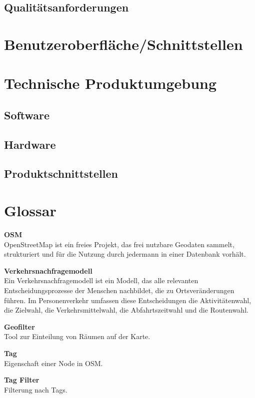 \documentclass[parskip=full]{scrartcl} %
\begin{document}
\subsection{Qualitätsanforderungen}


\newpage



\section{Benutzeroberfläche/Schnittstellen}
\newpage



\section{Technische Produktumgebung}

\subsection{Software}
\subsection{Hardware}
\subsection{Produktschnittstellen}

\section{Glossar}
\textbf{OSM}\\
OpenStreetMap ist ein freies Projekt, das frei nutzbare Geodaten sammelt, strukturiert und für die Nutzung durch jedermann in einer Datenbank vorhält.

\textbf{Verkehrsnachfragemodell}\\
Ein Verkehrsnachfragemodell ist ein Modell, das alle relevanten Entscheidungsprozesse der Menschen nachbildet, die zu Ortsveränderungen führen. Im Personenverkehr umfassen diese Entscheidungen die Aktivitätenwahl, die Zielwahl, die Verkehrsmittelwahl, die Abfahrtszeitwahl und die Routenwahl.

\textbf{Geofilter}\\
Tool zur Einteilung von Räumen auf der Karte.

\textbf{Tag}\\
Eigenschaft einer Node in OSM.

\textbf{Tag Filter}\\
Filterung nach Tags.
\end{document}
